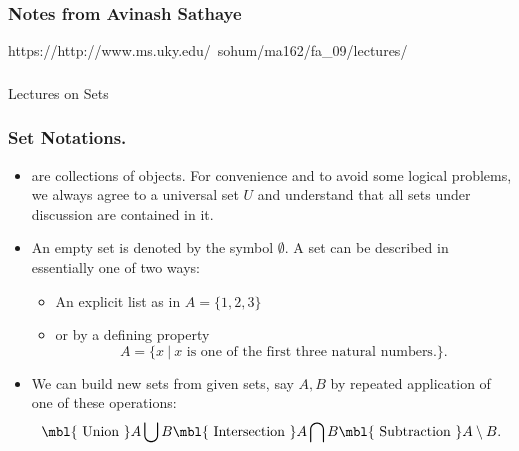  \begin{frame}[fragile] \frametitle{Notes from Avinash Sathaye}
https://http://www.ms.uky.edu/~sohum/ma162/fa\_09/lectures/
\end{frame}

 \begin{frame}[fragile]\frametitle{}
\begin{center}
{\Large Lectures on Sets}

\end{center}
\end{frame}

\begin{frame} %

  \frametitle{Set Notations.}
 \begin{itemize}%
\item {}  are collections of objects.
For convenience and to avoid some logical problems, we always agree
to a universal set $U$ and understand that all sets under discussion
are contained in it.

\item An empty set is denoted by the symbol $\emptyset$.
A set can be described in essentially one of two ways:
\begin{itemize}
\item 
An explicit list  as in $A=\{1,2,3\}$
\item or  by a defining property   
$$A = \{x ~|~ x \mbox{ is one of the first three natural numbers.} \}.$$
\end{itemize}

\item 
We can build new sets from given sets, say $A,B$  by repeated application
of one of these operations:
$$\mbl{\mbox{ Union }} A \bigcup B \mbl{\mbox{ Intersection }} A \bigcap B
\mbl{\mbox{ Subtraction }}
A \setminus B.$$

\end{itemize}
\pause 
\end{frame}

%


